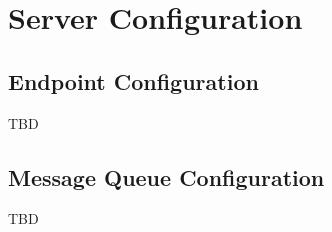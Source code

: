 \section{Server Configuration}\label{sec:resolver-server}

\subsection{\cxoneflow Endpoint Configuration}
TBD


\subsection{Message Queue Configuration}

TBD